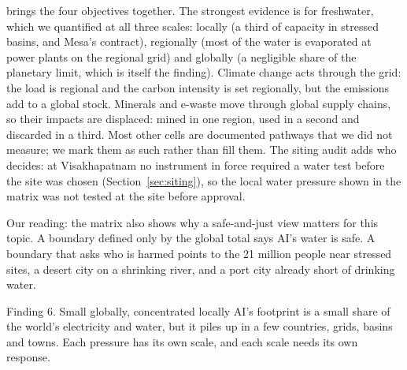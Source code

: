  brings the four objectives together. The strongest evidence is for freshwater, which we quantified
at all three scales: locally (a third of capacity in stressed basins, and Mesa's contract), regionally (most of the
water is evaporated at power plants on the regional grid) and globally (a negligible share of the planetary limit,
which is itself the finding). Climate change acts through the grid: the load is regional and the carbon intensity is set
regionally, but the emissions add to a global stock. Minerals and e-waste move through global supply chains, so their
impacts are displaced: mined in one region, used in a second and discarded in a third. Most other cells are documented
pathways that we did not measure; we mark them as such rather than fill them. The siting audit adds who decides:
at Visakhapatnam no instrument in force required a water test before the site was chosen (Section~\ref{sec:siting}), so the
local water pressure shown in the matrix was not tested at the site before approval.

\begin{reading}
Our reading: the matrix also shows why a safe-and-just view \citep{rockstrom2023} matters for this topic. A boundary
defined only by the global total says AI's water is safe. A boundary that asks who is harmed points to the 21 million
people near stressed sites, a desert city on a shrinking river, and a port city already short of drinking water.
\end{reading}

\begin{finding}{Finding 6. Small globally, concentrated locally}
AI's footprint is a small share of the world's electricity and water, but it piles up in a few countries, grids,
basins and towns. Each pressure has its own scale, and each scale needs its own response.
\end{finding}
